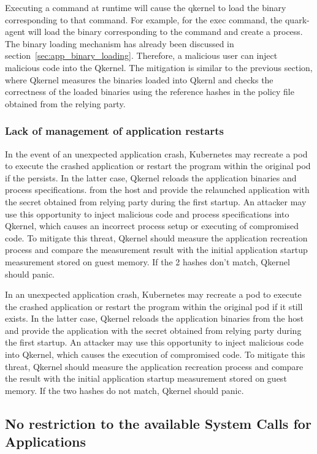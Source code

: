 Executing a command at runtime will cause the qkernel to load the binary corresponding to that command. For example, for the exec command, the quark-agent will load the binary corresponding to the command and create a process. The binary loading 
mechanism has already been discussed in section~\ref{sec:app_binary_loading}.   Therefore, a malicious user can inject malicious code into the Qkernel. The mitigation is similar to the previous section, where Qkernel measures the binaries loaded into Qkernl and checks 
the correctness of the loaded binaries using the reference hashes in the policy file obtained from the relying party.


\subsubsection{Lack of management of application restarts}

In the event of an unexpected application crash, Kubernetes may recreate a pod to execute the crashed application or restart the program within the original pod if the persists. In the latter case, Qkernel reloads the application binaries 
and process specifications. from the host and provide the relaunched application with the secret obtained from relying party during the first startup. An attacker may use this opportunity to inject malicious code and process specifications into Qkernel, 
which causes an incorrect process setup or executing of compromised code. To mitigate this threat, Qkernel should measure the application recreation process and compare the measurement result with the initial application startup measurement stored 
on guest memory. If the 2 hashes don’t match,  Qkernel should panic.

In an unexpected application crash, Kubernetes may recreate a pod to execute the crashed application or restart the program within the original pod if it still exists\cite*{k8s}. In the latter case, Qkernel reloads the application binaries from the host 
and provide the application with the secret obtained from relying party during the first startup. An attacker may use this opportunity to inject malicious code into Qkernel, which causes the execution of compromised code. To mitigate this threat, 
Qkernel should measure the application recreation process and compare the result with the initial application startup measurement stored on guest memory. If the two hashes do not match, Qkernel should panic.

\subsection{No restriction to the available System Calls for Applications}

